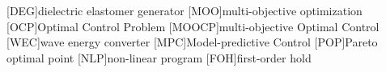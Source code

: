 \begin{acronym}
	[DEG]{dielectric elastomer generator}
	[MOO]{multi-objective optimization}
	[OCP]{Optimal Control Problem}
	[MOOCP]{multi-objective Optimal Control}
	[WEC]{wave energy converter}
	[MPC]{Model-predictive Control}
	[POP]{Pareto optimal point}
	[NLP]{non-linear program}
	[FOH]{first-order hold}
\end{acronym}